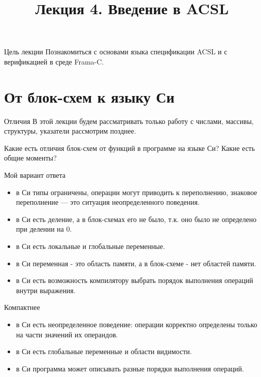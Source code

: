 \documentclass[hyperref={unicode=true}]{beamer}
\title{Лекция 4. Введение в ACSL}
\author{}
\date{}
\begin{document}
	\begin{frame}{}
		\titlepage
	\end{frame}

    \begin{frame}{Цель лекции}
    Познакомиться с основами языка спецификации ACSL и с верификацией в
    среде Frama-C.
    \end{frame}

    \section{От блок-схем к языку Си}

    \begin{frame}{Отличия}
    В этой лекции будем рассматривать только работу с числами, массивы,
    структуры, указатели рассмотрим позднее.

    Какие есть отличия блок-схем от функций в программе на языке Си? Какие есть
    общие моменты?
    \end{frame}

    \begin{frame}{Мой вариант ответа}
    \begin{itemize}
    \item в Си типы ограничены, операции могут приводить к переполнению,
    знаковое переполнение --- это ситуация неопределенного поведения.
    \item в Си есть деление, а в блок-схемах его не было, т.к. оно было не
    определено при делении на 0.
    \item в Си есть локальные и глобальные переменные.
    \item в Си переменная - это область памяти, а в блок-схеме - нет областей
    памяти.
    \item в Си есть возможность компилятору выбрать порядок выполнения
    операций внутри выражения.
    \end{itemize}
	\end{frame}

    \begin{frame}{Компактнее}
    \begin{itemize}
    \item в Си есть неопределенное поведение: операции корректно определены
    только на части значений их операндов.
    \item в Си есть глобальные переменные и области видимости.
    \item в Си программа может описывать разные порядки выполнения операций.
    \end{itemize}
    \end{frame}
\end{document}
